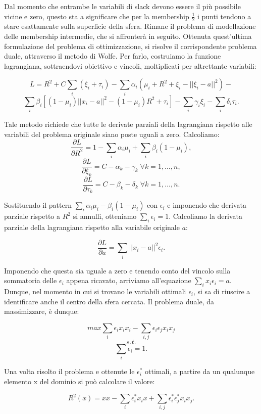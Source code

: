 \documentclass[12pt,a4paper]{report}
\begin{document}
Dal momento che entrambe le variabili di slack devono essere il più possibile vicine e zero, questo sta a significare che per la membership  $\frac{1}{2}$ i punti tendono a stare esattamente sulla superficie della sfera. Rimane il problema di modellazione delle membership intermedie, che si affronterà in seguito.
Ottenuta quest'ultima formulazione del problema di ottimizzazione, si risolve il corrispondente problema duale, attraverso il metodo di Wolfe. Per farlo, costruiamo la funzione lagrangiana, sottraendovi obiettivo e vincoli, moltiplicati per altrettante variabili:

\[ L = R^2 + C\sum_{i}(\xi_i + \tau_i) - \sum_{i}\alpha_i(\mu_i+R^2 + \xi_i - ||\xi_i - a||^2) -\] 
\[\sum_{i}\beta_i[(1- \mu_i)||x_i - a||^2 - (1 - \mu_i)R^2 + \tau_i] -  \sum_{i}\gamma_i\xi_i - \sum_{i}\delta_i\tau_i.\]

Tale metodo richiede che tutte le derivate parziali della lagrangiana rispetto alle variabili del problema originale siano poste uguali a zero. Calcoliamo:
\[ \frac{\partial L}{\partial R^2} = 1- \sum_{i}\alpha_i\mu_i + \sum_{i}\beta_i(1 - \mu_i),\]
\[ \frac{\partial L}{\partial \xi_k} = C - 	\alpha_k - \gamma_k  \; \forall k = 1, \dots, n,\]
\[ \frac{\partial L}{\partial \tau_k} = C - \beta_k - \delta_k  \; \forall k = 1, \dots, n.\]

Sostituendo il pattern $\sum_{i}\alpha_i\mu_i - \beta_i(1-\mu_i)$ con $\epsilon_i$ e imponendo che derivata parziale rispetto a $R^2$ si annulli, otteniamo $\sum_{i}\epsilon_i = 1$.
Calcoliamo la derivata parziale della lagrangiana rispetto alla variabile originale $a$:

\[ \frac{\partial L}{\partial a} = \sum_{i}||x_i - a||^2\epsilon_i.\]

Imponendo che questa sia uguale a zero e tenendo conto del vincolo sulla sommatoria delle $\epsilon_i$ appena ricavato,  arriviamo all'equazione  $\sum_{i}x_i\epsilon_i = a$. Dunque, nel momento in cui si trovano le variabili ottimali $\epsilon_i$, si sa di riuscire a identificare anche il centro della sfera cercata.
Il problema duale, da massimizzare, è dunque:

\[ max \sum_{i}\epsilon_ix_ix_i - \sum_{i,j}\epsilon_i\epsilon_jx_ix_j\]
\[s.t.\]
\[\sum_i\epsilon_i = 1.\]

Una volta risolto il problema e ottenute le $\epsilon_i^*$ ottimali, a partire da un qualunque elemento x del dominio si può calcolare il valore:

\[ R^2(x) = xx - \sum_{i}\epsilon_i^*x_ix + \sum_{i,j}\epsilon_i^*\epsilon_j^*x_ix_j.\]
\end{document}
